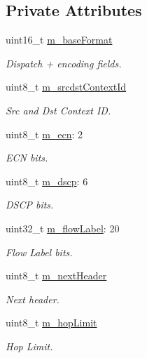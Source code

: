 \subsection*{Private Attributes}
\begin{DoxyCompactItemize}
\item 
uint16\+\_\+t \hyperlink{classns3_1_1SixLowPanIphc_ae0cee2eba42680d99b7e4baf7cb9ffd3}{m\+\_\+base\+Format}
\begin{DoxyCompactList}\small\item\em Dispatch + encoding fields. \end{DoxyCompactList}\item 
uint8\+\_\+t \hyperlink{classns3_1_1SixLowPanIphc_a2ac21694d4204b8c057cad088281c4dd}{m\+\_\+srcdst\+Context\+Id}
\begin{DoxyCompactList}\small\item\em Src and Dst Context ID. \end{DoxyCompactList}\item 
uint8\+\_\+t \hyperlink{classns3_1_1SixLowPanIphc_afe53cdf7b26c9636a4e63e335b35ac12}{m\+\_\+ecn}\+: 2
\begin{DoxyCompactList}\small\item\em E\+CN bits. \end{DoxyCompactList}\item 
uint8\+\_\+t \hyperlink{classns3_1_1SixLowPanIphc_a88ee2fccd0208d167d1de259751e3e18}{m\+\_\+dscp}\+: 6
\begin{DoxyCompactList}\small\item\em D\+S\+CP bits. \end{DoxyCompactList}\item 
uint32\+\_\+t \hyperlink{classns3_1_1SixLowPanIphc_af9e6e3991d8b77caf1349088021833ce}{m\+\_\+flow\+Label}\+: 20
\begin{DoxyCompactList}\small\item\em Flow Label bits. \end{DoxyCompactList}\item 
uint8\+\_\+t \hyperlink{classns3_1_1SixLowPanIphc_ae17f4c6ba6d27ec812c7d8ae441c60bd}{m\+\_\+next\+Header}
\begin{DoxyCompactList}\small\item\em Next header. \end{DoxyCompactList}\item 
uint8\+\_\+t \hyperlink{classns3_1_1SixLowPanIphc_a532347e6c681f0a361fddc05ef3fef84}{m\+\_\+hop\+Limit}
\begin{DoxyCompactList}\small\item\em Hop Limit. \end{DoxyCompactList}\item 

\end{DoxyCompactItemize}
